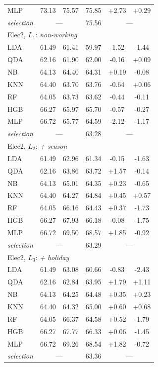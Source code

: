 \begin{tabular}{@{}lccccc@{}}
MLP & 73.13 & 75.57 & 75.85 & +2.73 & +0.29 \\
\textit{selection} & \multicolumn{2}{c}{---} & 75.56 & \multicolumn{2}{c}{---}\\
\midrule
\multicolumn{6}{l}{Elec2, $L_1$: \textit{non-working}}\\
LDA & 61.49 & 61.41 & 59.97 & -1.52 & -1.44 \\
QDA & 62.16 & 61.90 & 62.00 & -0.16 & +0.09 \\
NB & 64.13 & 64.40 & 64.31 & +0.19 & -0.08 \\
KNN & 64.40 & 63.70 & 63.76 & -0.64 & +0.06 \\
RF & 64.05 & 63.73 & 63.62 & -0.44 & -0.11 \\
HGB & 66.27 & 65.97 & 65.70 & -0.57 & -0.27 \\
MLP & 66.72 & 65.77 & 64.59 & -2.12 & -1.17 \\
\textit{selection} & \multicolumn{2}{c}{---} & 63.28 & \multicolumn{2}{c}{---}\\
\midrule
\multicolumn{6}{l}{Elec2, $L_2$: \textit{+ season}}\\
LDA & 61.49 & 62.96 & 61.34 & -0.15 & -1.63 \\
QDA & 62.16 & 63.86 & 63.72 & +1.57 & -0.14 \\
NB & 64.13 & 65.01 & 64.35 & +0.23 & -0.65 \\
KNN & 64.40 & 64.27 & 64.84 & +0.45 & +0.57 \\
RF & 64.05 & 66.16 & 64.43 & +0.37 & -1.73 \\
HGB & 66.27 & 67.93 & 66.18 & -0.08 & -1.75 \\
MLP & 66.72 & 69.50 & 68.57 & +1.85 & -0.92 \\
\textit{selection} & \multicolumn{2}{c}{---} & 63.29 & \multicolumn{2}{c}{---}\\
\midrule
\multicolumn{6}{l}{Elec2, $L_3$: \textit{+ holiday}}\\
LDA & 61.49 & 63.08 & 60.66 & -0.83 & -2.43 \\
QDA & 62.16 & 62.84 & 63.95 & +1.79 & +1.11 \\
NB & 64.13 & 64.25 & 64.48 & +0.35 & +0.23 \\
KNN & 64.40 & 64.32 & 65.00 & +0.60 & +0.68 \\
RF & 64.05 & 66.37 & 64.58 & +0.52 & -1.79 \\
HGB & 66.27 & 67.77 & 66.33 & +0.06 & -1.45 \\
MLP & 66.72 & 69.26 & 68.54 & +1.82 & -0.72 \\
\textit{selection} & \multicolumn{2}{c}{---} & 63.36 & \multicolumn{2}{c}{---}\\
\bottomrule
\end{tabular}
